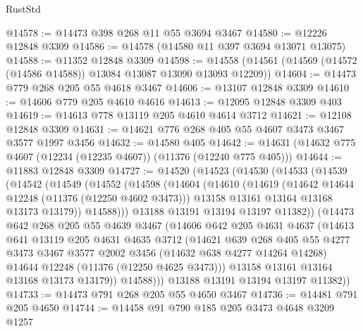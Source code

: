 \begin{lexlean}{RustStd}
\begin{coremodule}
{\begin{coremodule}
{{{{{{{{{{{{{{{{{{{{{{{{{{{{{{{{{{{{{{{{{{{{{{{{{{{{{{{{{{{{{{{{{{{{{{{{{{{{{{{{{{{{{@14578 := @14473 @398 @268 @11 @55 @3694 @3467
@14580 := @12226 @12848 @3309
@14586 := @14578 (@14580 @11 @397 @3694 @13071 @13075)
@14588 := @11352 @12848 @3309
@14598 := @14558 (@14561 (@14569 (@14572 (@14586 @14588)) @13084 @13087 @13090 @13093 @12209))
@14604 := @14473 @779 @268 @205 @55 @4618 @3467
@14606 := @13107 @12848 @3309
@14610 := @14606 @779 @205 @4610 @4616
@14613 := @12095 @12848 @3309 @403
@14619 := @14613 @778 @13119 @205 @4610 @4614 @3712
@14621 := @12108 @12848 @3309
@14631 := @14621 @776 @268 @405 @55 @4607 @3473 @3467 @3577 @1997 @3456
@14632 := @14580 @405
@14642 := @14631 (@14632 @775 @4607 (@12234 (@12235 @4607)) (@11376 (@12240 @775 @405)))
@14644 := @11883 @12848 @3309
@14727 := @14520
    (@14523
      (@14530
        (@14533
          (@14539
            (@14542
              (@14549
                (@14552
                  (@14598
                    (@14604
                      (@14610
                        (@14619
                          (@14642 @14644 @12248 (@11376 (@12250 @4602 @3473)))
                          @13158
                          @13161
                          @13164
                          @13168
                          @13173
                          @13179))
                      @14588)))
                @13188
                @13191
                @13194
                @13197
                @11382))
            (@14473
              @642
              @268
              @205
              @55
              @4639
              @3467
              (@14606
                @642
                @205
                @4631
                @4637
                (@14613
                  @641
                  @13119
                  @205
                  @4631
                  @4635
                  @3712
                  (@14621
                    @639
                    @268
                    @405
                    @55
                    @4277
                    @3473
                    @3467
                    @3577
                    @2002
                    @3456
                    (@14632 @638 @4277 @14264 @14268)
                    @14644
                    @12248
                    (@11376 (@12250 @4625 @3473)))
                  @13158
                  @13161
                  @13164
                  @13168
                  @13173
                  @13179))
              @14588)))
        @13188
        @13191
        @13194
        @13197
        @11382))
@14733 := @14473 @791 @268 @205 @55 @4650 @3467
@14736 := @14481 @791 @205 @4650
@14744 := @14458 @91 @790 @185 @205 @3473 @4648 @3209 @1257
}}}}}}}}}}}}}}}}}}}}}}}}}}}}}}}}}}}}}}}}}}}}}}}}}}}}}}}}}}}}}}}}}}}}}}}}}}}}}}}}}}}}}
\end{coremodule}}
\end{coremodule}
\end{lexlean}
